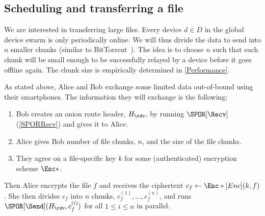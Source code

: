 \subsection{Scheduling and transferring a file}%
\label{file-transfer}

We are interested in transferring large files.
Every device \(d\in D\) in the global device swarm is only periodically online.
We will thus divide the data to send into \(n\) smaller chunks (similar to 
BitTorrent~\cite{BitTorrent}).
The idea is to choose \(n\) such that each chunk will be small enough to be 
successfully relayed by a device before it goes offline again.
The chunk size is empirically determined in \cref{Performance}.

As stated above, Alice and Bob exchange some limited data out-of-bound using 
their smartphones.
The information they will exchange is the following:
\begin{enumerate}
  \item Bob creates an onion route header, \(H_\rdv\), by running 
    \(\SPOR[\Recv]\) (\cref{SPORRecv}) and gives it to Alice.
  \item Alice gives Bob number of file chunks, \(n\), and the size of the file 
    chunks.
  \item They agree on a file-specific key \(k\) for some (authenticated) 
    encryption scheme \(\Enc*\).
\end{enumerate}
Then Alice encrypts the file \(f\) and receives the ciphertext \(c_f\gets 
  \Enc*[Enc](k, f)\).
She then divides \(c_f\) into \(n\) chunks, \(c_f^{(1)}, \dotsc, c_f^{(n)}\), 
and runs \(\SPOR[\Send](H_\rdv, c_f^{(i)})\) for all \(1\leq i\leq n\) in 
parallel.
